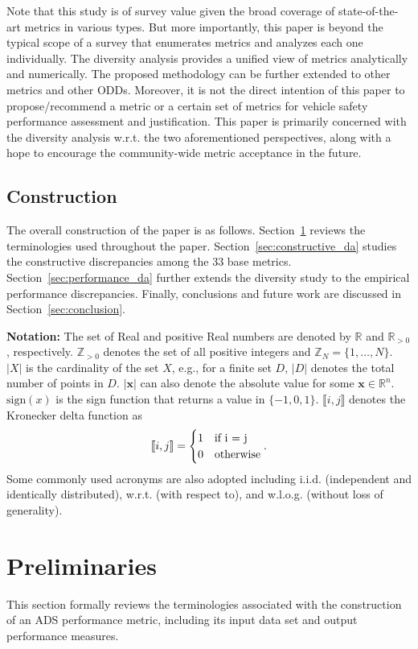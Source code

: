 \documentclass[journal]{IEEEtran}
\newcommand{\R}{\mathbb{R}}
\newcommand{\Z}{\mathbb{Z}}
\newcommand{\x}{\mathbf{x}}
\begin{document}
Note that this study is of survey value given the broad coverage of state-of-the-art metrics in various types. But more importantly, this paper is beyond the typical scope of a survey that enumerates metrics and analyzes each one individually. The diversity analysis provides a unified view of metrics analytically and numerically. The proposed methodology can be further extended to other metrics and other ODDs. Moreover, it is not the direct intention of this paper to propose/recommend a metric or a certain set of metrics for vehicle safety performance assessment and justification. This paper is primarily concerned with the diversity analysis w.r.t. the two aforementioned perspectives, along with a hope to encourage the community-wide metric acceptance in the future.

\subsection{Construction}
The overall construction of the paper is as follows. Section~\ref{sec:preliminaries} reviews the terminologies used throughout the paper. Section~\ref{sec:constructive_da} studies the constructive discrepancies among the 33 base metrics. Section~\ref{sec:performance_da} further extends the diversity study to the empirical performance discrepancies. Finally, conclusions and future work are discussed in Section~\ref{sec:conclusion}.

\textbf{Notation: } The set of Real and positive Real numbers are denoted by $\R$ and $\R_{>0}$, respectively. $\Z_{>0}$ denotes the set of all positive integers and $\Z_N=\{1,\ldots,N\}$. $|X|$ is the cardinality of the set $X$, e.g., for a finite set $D$, $|D|$ denotes the total number of points in $D$. $|\x|$ can also denote the absolute value for some $\x \in \R^n$. $\text{sign}(x)$ is the sign function that returns a value in $\{-1,0,1\}$. $\llbracket i, j \rrbracket$ denotes the Kronecker delta function as 
\begin{equation}\label{eq:kdf}
    \llbracket i, j \rrbracket = 
    \begin{cases}
    1 & \text{if } $i = j$ \\
    0 & \text{otherwise}
  \end{cases}.
\end{equation}
Some commonly used acronyms are also adopted including i.i.d. (independent and identically distributed), w.r.t. (with respect to), and w.l.o.g. (without loss of generality). 

\section{Preliminaries}\label{sec:preliminaries}
This section formally reviews the terminologies associated with the construction of an ADS performance metric, including its input data set and output performance measures.
\end{document}

